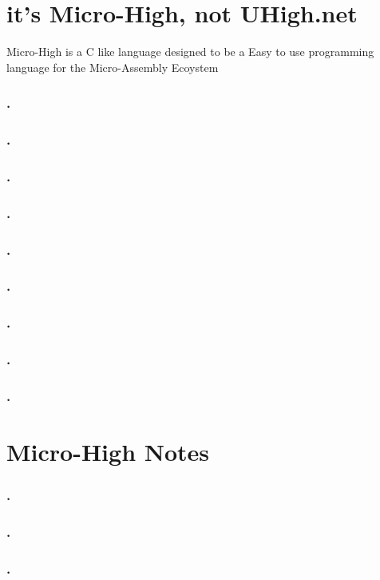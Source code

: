 \documentclass[a4paper,11pt]{book}
\begin{document}
\chapter{it's Micro-High, not UHigh.net}

Micro-High is a C like language designed to be a Easy to use programming language for the 
Micro-Assembly Ecoystem

\subsection{.}
\subsection{.}
\subsection{.}
\subsection{.}
\subsection{.}
\subsection{.}
\subsection{.}
\subsection{.}
\subsection{.}

\chapter{Micro-High Notes}

\subsection{.}
\subsection{.}
\subsection{.}
\end{document}
